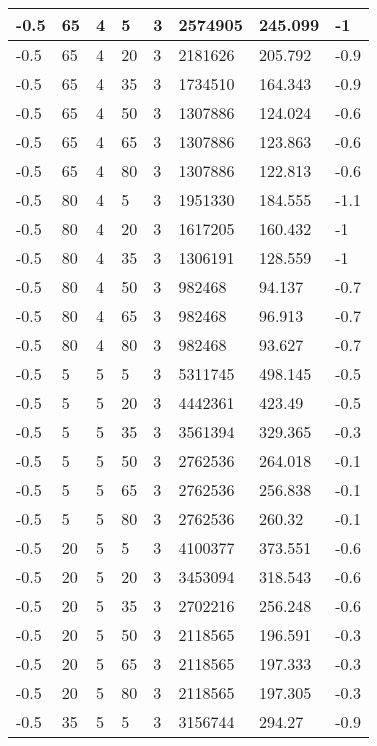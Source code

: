 \begin{longtable}{|p{1.4cm}|p{1.4cm}|p{1.4cm}|p{1.4cm}|p{1.4cm}|p{1.4cm}|p{1.4cm}|p{1.5cm}|}
        -0.5 & 65 & 4 & 5 & 3 & 2574905 & 245.099 & -1 \\ \hline
        -0.5 & 65 & 4 & 20 & 3 & 2181626 & 205.792 & -0.9 \\ \hline
        -0.5 & 65 & 4 & 35 & 3 & 1734510 & 164.343 & -0.9 \\ \hline
        -0.5 & 65 & 4 & 50 & 3 & 1307886 & 124.024 & -0.6 \\ \hline
        -0.5 & 65 & 4 & 65 & 3 & 1307886 & 123.863 & -0.6 \\ \hline
        -0.5 & 65 & 4 & 80 & 3 & 1307886 & 122.813 & -0.6 \\ \hline
        -0.5 & 80 & 4 & 5 & 3 & 1951330 & 184.555 & -1.1 \\ \hline
        -0.5 & 80 & 4 & 20 & 3 & 1617205 & 160.432 & -1 \\ \hline
        -0.5 & 80 & 4 & 35 & 3 & 1306191 & 128.559 & -1 \\ \hline
        -0.5 & 80 & 4 & 50 & 3 & 982468 & 94.137 & -0.7 \\ \hline
        -0.5 & 80 & 4 & 65 & 3 & 982468 & 96.913 & -0.7 \\ \hline
        -0.5 & 80 & 4 & 80 & 3 & 982468 & 93.627 & -0.7 \\ \hline
        -0.5 & 5 & 5 & 5 & 3 & 5311745 & 498.145 & -0.5 \\ \hline
        -0.5 & 5 & 5 & 20 & 3 & 4442361 & 423.49 & -0.5 \\ \hline
        -0.5 & 5 & 5 & 35 & 3 & 3561394 & 329.365 & -0.3 \\ \hline
        -0.5 & 5 & 5 & 50 & 3 & 2762536 & 264.018 & -0.1 \\ \hline
        -0.5 & 5 & 5 & 65 & 3 & 2762536 & 256.838 & -0.1 \\ \hline
        -0.5 & 5 & 5 & 80 & 3 & 2762536 & 260.32 & -0.1 \\ \hline
        -0.5 & 20 & 5 & 5 & 3 & 4100377 & 373.551 & -0.6 \\ \hline
        -0.5 & 20 & 5 & 20 & 3 & 3453094 & 318.543 & -0.6 \\ \hline
        -0.5 & 20 & 5 & 35 & 3 & 2702216 & 256.248 & -0.6 \\ \hline
        -0.5 & 20 & 5 & 50 & 3 & 2118565 & 196.591 & -0.3 \\ \hline
        -0.5 & 20 & 5 & 65 & 3 & 2118565 & 197.333 & -0.3 \\ \hline
        -0.5 & 20 & 5 & 80 & 3 & 2118565 & 197.305 & -0.3 \\ \hline
        -0.5 & 35 & 5 & 5 & 3 & 3156744 & 294.27 & -0.9 \\ \hline

\end{longtable}
